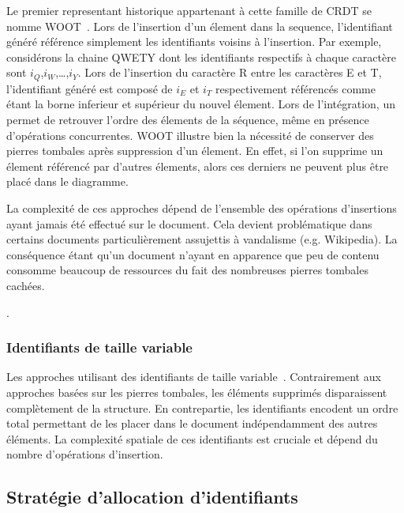 Le premier representant historique appartenant à cette famille de CRDT se nomme
WOOT~\cite{oster2006data}. Lors de l'insertion d'un élement dans la sequence,
l'identifiant généré référence simplement les identifiants voisins à
l'insertion. Par exemple, considérons la chaine QWETY dont les identifiants
respectifs à chaque caractère sont $i_Q$,$i_W$,\ldots,$i_Y$. Lors de l'insertion
du caractère R entre les caractères E et T, l'identifiant généré est composé de
$i_E$ et $i_T$ respectivement référencés comme étant la borne inferieur et
supérieur du nouvel élement. Lors de l'intégration, un 
permet de retrouver l'ordre des élements de la séquence, même en présence
d'opérations concurrentes. WOOT illustre bien la nécessité de conserver des
pierres tombales après suppression d'un élement. En effet, si l'on supprime un
élement référencé par d'autres élements, alors ces derniers ne peuvent plus être
placé dans le diagramme.

La complexité de ces approches dépend de l'ensemble des opérations d'insertions
ayant jamais été effectué sur le document. Cela devient problématique dans
certains documents particulièrement assujettis à vandalisme (e.g. Wikipedia). La
conséquence étant qu'un document n'ayant en apparence que peu de contenu
consomme beaucoup de ressources du fait des nombreuses pierres tombales cachées.

.

\subsubsection{Identifiants de taille variable}

Les approches utilisant des identifiants de taille
variable~\cite{preguica2009commutative, andre2013supporting,
  weiss2009logoot}. Contrairement aux approches basées sur les pierres tombales,
les éléments supprimés disparaissent complètement de la structure. En
contrepartie, les identifiants encodent un ordre total permettant de les placer
dans le document indépendamment des autres éléments. La complexité spatiale de
ces identifiants est cruciale et dépend du nombre d'opérations d'insertion.

\subsection{Stratégie d'allocation d'identifiants}


